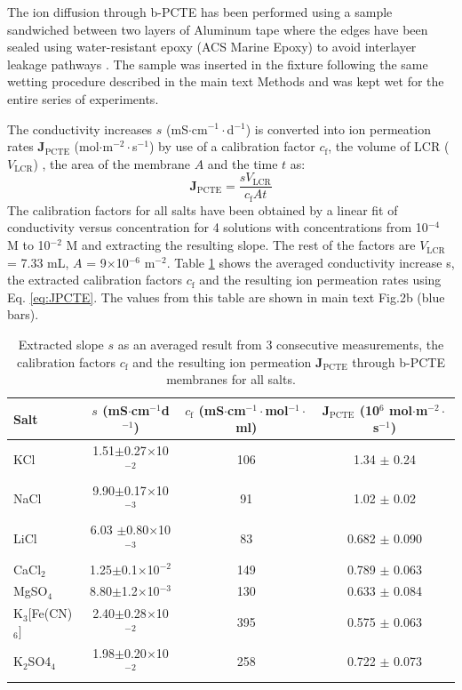 \documentclass[manuscript=suppinfo,email=true, hyperref=true, keywords=false]{achemso}
\newcommand{\Fig}{Fig.}
\begin{document}
The ion diffusion through b-PCTE has been performed using a sample
sandwiched between two layers of Aluminum tape where the edges have
been sealed using water-resistant epoxy (ACS Marine Epoxy) to avoid
interlayer leakage pathways \cite{Choi_2018}.  The sample was inserted in
the fixture following the same wetting procedure described in the main
text Methods and was kept wet for the entire series of experiments.

The conductivity increases $s$ (mS$\cdot$cm$^{-1}\cdot$d$^{-1}$) is
converted into ion permeation rates $\boldsymbol{J}_{\mathrm{PCTE}}$
(mol$\cdot$m$^{-2}\cdot$s$^{-1}$) by use of a calibration factor
$c_{\mathrm{f}}$, the volume of LCR ($V_{\mathrm{LCR}}$) , the area of
the membrane $A$ and the time $t$ as:
\begin{equation}
  \label{eq:JPCTE}
  \boldsymbol{J}_{\mathrm{PCTE}} = \frac{s V_{\mathrm{LCR}}}{c_{\mathrm{f}} A t}
\end{equation}
The calibration factors for all salts have been obtained by a linear
fit of conductivity versus concentration for 4 solutions with
concentrations from 10$^{-4}$ M to 10$^{-2}$ M and extracting the
resulting slope. The rest of the factors are $V_{\mathrm{LCR}}$ = 7.33
mL, $A$ = 9$\times$10$^{-6}$ m$^{-2}$. Table \ref{tab:exp-2} shows the
averaged conductivity increase s, the extracted calibration factors
$c_{\mathrm{f}}$ and the resulting ion permeation rates using
Eq. \ref{eq:JPCTE}. The values from this table are shown in main text \Fig 2b
(blue bars).
\begin{table}[htbp]
  \centering
  \begin{tabular}{lccc}
    \hline
    Salt & $s$ (mS$\cdot$cm$^{-1}$d$^{-1}$) & $c_{\mathrm{f}}$ (mS$\cdot$cm$^{-1}\cdot$mol$^{-1}\cdot$ml) &
                                                                                                            $\boldsymbol{J}_{\mathrm{PCTE}}$ (10$^{6}$ mol$\cdot$m$^{-2}\cdot$s$^{-1}$)\\
    \hline
    KCl & 1.51$\pm$0.27$\times$10$^{-2}$  & 106   & 1.34 $\pm$ 0.24\\
    NaCl        & 9.90$\pm$0.17$\times$10$^{-3}$ & 91    & 1.02 $\pm$ 0.02\\
    LiCl        & 6.03 $\pm$0.80$\times$10$^{-3}$        & 83    & 0.682 $\pm$ 0.090\\
    CaCl$_{2}$  & 1.25$\pm$0.1$\times$10$^{-2}$    & 149   & 0.789 $\pm$ 0.063\\
    MgSO$_{4}$  & 8.80$\pm$1.2$\times$10$^{-3}$   & 130   & 0.633 $\pm$ 0.084\\
    K$_{3}$[Fe(CN)$_{6}]$ & 2.40$\pm$0.28$\times$10$^{-2}$   & 395   & 0.575 $\pm$ 0.063\\
    K$_{2}$SO4$_{4}$    & 1.98$\pm$0.20$\times$10$^{-2}$  & 258   & 0.722 $\pm$ 0.073\\
    \hline
  \end{tabular}
  \caption{Extracted slope $s$ as an averaged result from 3 consecutive
    measurements, the calibration factors $c_{\mathrm{f}}$ and the resulting ion
    permeation $\boldsymbol{J}_{\mathrm{PCTE}}$ through b-PCTE membranes for all salts.}
  \label{tab:exp-2}
\end{table}
\end{document}
